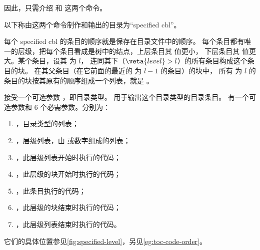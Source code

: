 \documentclass[twoside]{book}
\begin{document}
因此，只需介绍  和 
 这两个命令。

以下称由这两个命令制作和输出的目录为“specified cbl”。

每个 specified cbl 的条目的顺序就是保存在目录文件中的顺序。
每个条目都有唯一的层级，把每个条目看成是树中的结点，上层条目其  值更小，
下层条目其  值更大。某个条目，设其  为 $l$，
连同其下（$\veta{level}>l$）的所有条目构成这个条目的块。
在其父条目（在它前面的最近的  为 $l-1$ 的条目）的块中，
所有  为 $l$ 的条目的块按其原有的顺序组成一个列表，就是 。

 接受一个可选参数 ，即目录类型。
用于输出这个目录类型的目录条目。
 有一个可选参数和 6 个必需参数。分别为：
\begin{enumerate}
  \item {}，目录类型的列表；
  \item {}，层级列表，由  或数字组成的列表；
  \item {}，此层级列表开始时执行的代码；
  \item {}，此层级的块开始时执行的代码；
  \item {}，此条目执行的代码；
  \item {}，此层级的块结束时执行的代码；
  \item {}，此层级列表结束时执行的代码。
\end{enumerate}
它们的具体位置参见\cref{fig:specified-level}，另见\cref{eg:toc-code-order}。
\end{document}
